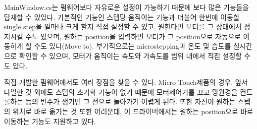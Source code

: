 MainWindow.cs는 펌웨어보다 자유로운 설정이 가능하기 때문에 보다 많은 기능들을 탑재할 수 있었다. 기본적인 기능인 스텝당 움직이는 기능과 더불어 한번에 이동할 single step을 얼마나 크게 할지 직접 설정할 수 있고, 원한다면 모터를 그 상태에서 정지시킬 수도 있으며, 원하는 position을 입력하면 모터가 그 position으로 자동으로 이동하게 할 수도 있다(Move to). 부가적으로는 microstepping과 온도 및 습도를 실시간으로 확인할 수 있으며, 모터가 움직이는 속도와 가속도를 범위 내에서 직접 설정할 수도 있다.

직접 개발한 펌웨어에서도 여러 장점을 찾을 수 있다. Micro Touch제품의 경우, 앞서 나열한 것 외에도 스텝의 초기화 기능이 없기 때문에 모터제어기를 끄고 망원경을 컨트롤하는 등의 변수가 생기면 그 전으로 돌아가기 어렵게 된다. 또한 자신이 원하는 스텝의 위치로 바로 옮기는 것 또한 어려운데, 이 드라이버에서는 원하는 position으로 바로 이동하는 기능도 지원하고 있다. 


